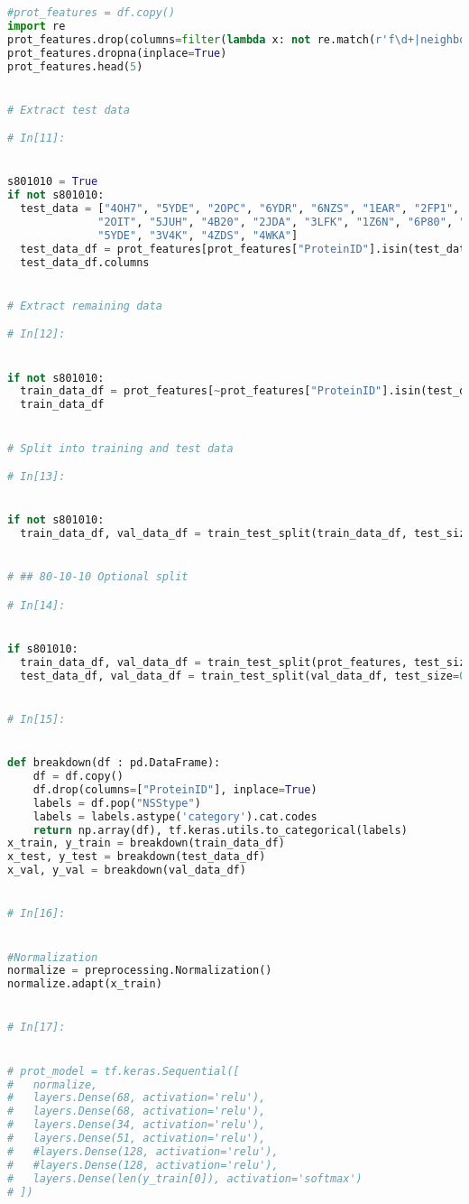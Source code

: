 \documentclass[12pt,letterpaper,oneside,reqno]{book}
\theoremstyle{plain}
\theoremstyle{definition}
\theoremstyle{plain}
\theoremstyle{remark}
\theoremstyle{plain}
\theoremstyle{definition}
\theoremstyle{plain}
\begin{document}
\begin{appendices}
\begin{lstlisting}[language=Python, label=lst:7classdcnnfull, frame=single]
#prot_features = df.copy()
import re
prot_features.drop(columns=filter(lambda x: not re.match(r'f\d+|neighbors|ProteinID|NSStype', x) ,prot_features.columns), inplace=True)
prot_features.dropna(inplace=True)
prot_features.head(5)


# Extract test data

# In[11]:


s801010 = True
if not s801010:
  test_data = ["4OH7", "5YDE", "2OPC", "6YDR", "6NZS", "1EAR", "2FP1", "2Z6R",
              "2OIT", "5JUH", "4B20", "2JDA", "3LFK", "1Z6N", "6P80", "5UEB",
              "5YDE", "3V4K", "4ZDS", "4WKA"]
  test_data_df = prot_features[prot_features["ProteinID"].isin(test_data)]
  test_data_df.columns


# Extract remaining data

# In[12]:


if not s801010:
  train_data_df = prot_features[~prot_features["ProteinID"].isin(test_data)]
  train_data_df


# Split into training and test data

# In[13]:


if not s801010:
  train_data_df, val_data_df = train_test_split(train_data_df, test_size=0.1)


# ## 80-10-10 Optional split

# In[14]:


if s801010:
  train_data_df, val_data_df = train_test_split(prot_features, test_size=0.2)
  test_data_df, val_data_df = train_test_split(val_data_df, test_size=0.5)


# In[15]:


def breakdown(df : pd.DataFrame):
    df = df.copy()
    df.drop(columns=["ProteinID"], inplace=True)
    labels = df.pop("NSStype")
    labels = labels.astype('category').cat.codes
    return np.array(df), tf.keras.utils.to_categorical(labels)
x_train, y_train = breakdown(train_data_df)
x_test, y_test = breakdown(test_data_df)
x_val, y_val = breakdown(val_data_df)


# In[16]:


#Normalization
normalize = preprocessing.Normalization()
normalize.adapt(x_train)


# In[17]:


# prot_model = tf.keras.Sequential([
#   normalize,
#   layers.Dense(68, activation='relu'),
#   layers.Dense(68, activation='relu'),
#   layers.Dense(34, activation='relu'),
#   layers.Dense(51, activation='relu'),
#   #layers.Dense(128, activation='relu'),
#   #layers.Dense(128, activation='relu'),
#   layers.Dense(len(y_train[0]), activation='softmax')
# ])


\end{lstlisting}
\end{appendices}
\end{document}
